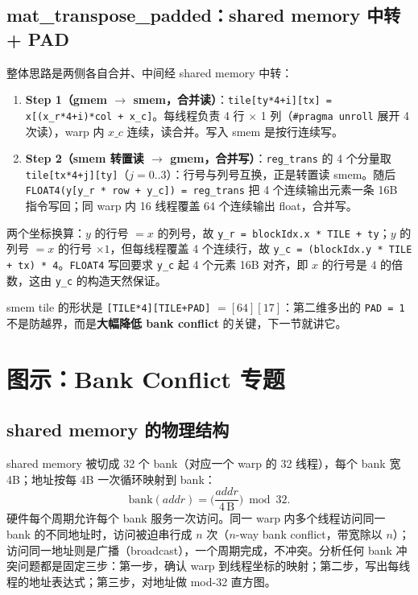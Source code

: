 \subsection{mat\_transpose\_padded：shared memory 中转 + PAD}



整体思路是两侧各自合并、中间经 shared memory 中转：
\begin{enumerate}
  \item \textbf{Step 1（gmem $\to$ smem，合并读）}：\texttt{tile[ty*4+i][tx] =\allowbreak{} x[\allowbreak{}(x\_\allowbreak{}r*4+i)*col + x\_\allowbreak{}c]}。每线程负责 4 行 $\times$ 1 列（\texttt{\#pragma unroll} 展开 4 次读），warp 内 $x\_c$ 连续，读合并。写入 smem 是按行连续写。
  \item \textbf{Step 2（smem 转置读 $\to$ gmem，合并写）}：\texttt{reg\_trans} 的 4 个分量取 \texttt{tile[tx*4+j][ty]}（$j = 0..3$）：行号与列号互换，正是转置读 smem。随后 \texttt{FLOAT4\allowbreak{}(y[y\_\allowbreak{}r * row + y\_\allowbreak{}c]) =\allowbreak{} reg\_\allowbreak{}trans} 把 4 个连续输出元素一条 16B 指令写回；同 warp 内 16 线程覆盖 64 个连续输出 float，合并写。
\end{enumerate}

两个坐标换算：$y$ 的行号 $= x$ 的列号，故 \texttt{y\_r = blockIdx.x * TILE + ty}；$y$ 的列号 $= x$ 的行号 $\times 1$，但每线程覆盖 4 个连续行，故 \texttt{y\_c = (blockIdx.y * TILE + tx) * 4}。\texttt{FLOAT4} 写回要求 \texttt{y\_c} 起 4 个元素 16B 对齐，即 $x$ 的行号是 4 的倍数，这由 \texttt{y\_c} 的构造天然保证。

smem tile 的形状是 \texttt{[TILE*4][TILE+PAD]} $= [64][17]$：第二维多出的 \texttt{PAD = 1} 不是防越界，而是\textbf{大幅降低 bank conflict} 的关键，下一节就讲它。

\section{图示：Bank Conflict 专题}

\subsection{shared memory 的物理结构}

shared memory 被切成 32 个 bank（对应一个 warp 的 32 线程），每个 bank 宽 4B；地址按每 4B 一次循环映射到 bank：
\begin{equation}
  \mathrm{bank}(addr) = \Big(\frac{addr}{4\,\mathrm{B}}\Big) \bmod 32 .
\end{equation}
硬件每个周期允许每个 bank 服务一次访问。同一 warp 内多个线程访问同一 bank 的不同地址时，访问被迫串行成 $n$ 次（$n$-way bank conflict，带宽除以 $n$）；访问同一地址则是广播（broadcast），一个周期完成，不冲突。分析任何 bank 冲突问题都是固定三步：第一步，确认 warp 到线程坐标的映射；第二步，写出每线程的地址表达式；第三步，对地址做 mod-32 直方图。


